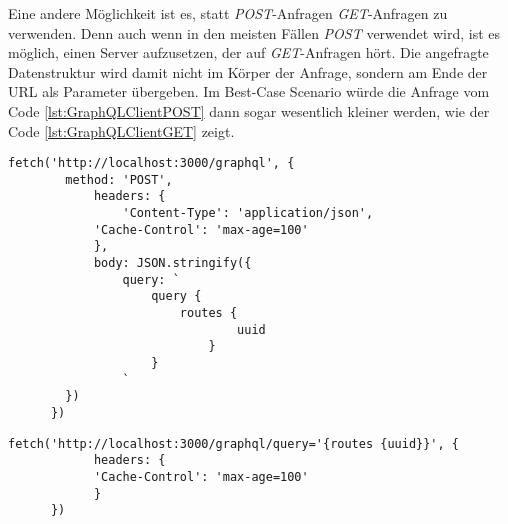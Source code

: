 Eine andere Möglichkeit ist es, statt \textit{POST}-Anfragen \textit{GET}-Anfragen zu verwenden. Denn auch wenn in den meisten Fällen \textit{POST} verwendet wird, ist es möglich, einen Server aufzusetzen, der auf \textit{GET}-Anfragen hört. Die angefragte Datenstruktur wird damit nicht im Körper der Anfrage, sondern am Ende der \ac{URL} als Parameter übergeben. Im Best-Case Scenario würde die Anfrage vom Code \ref{lst:GraphQLClientPOST} dann sogar wesentlich kleiner werden, wie der Code \ref{lst:GraphQLClientGET} zeigt.
\begin{lstlisting}[caption={GraphQL POST-Anfrage},captionpos=b,label=lst:GraphQLClientPOST] 
	fetch('http://localhost:3000/graphql', {
	   	method: 'POST',									
	    	headers: {
	      		'Content-Type': 'application/json',
			'Cache-Control': 'max-age=100'
	    	},
	    	body: JSON.stringify({
	      		query: `
	      			query { 
	       				routes { 
	          					uuid
	        				} 
	      			}
	      		` 
		})
	  })
\end{lstlisting}
\begin{minipage}{\linewidth}
\begin{lstlisting}[caption={GraphQL GET-Anfrage},captionpos=b,label=lst:GraphQLClientGET] 
	fetch('http://localhost:3000/graphql/query='{routes {uuid}}', {					
	    	headers: {
			'Cache-Control': 'max-age=100'
	    	}
	  })
\end{lstlisting}
\end{minipage}

